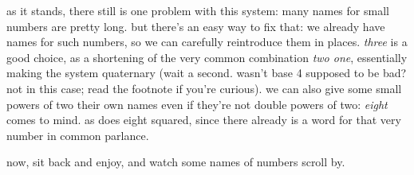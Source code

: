 \documentclass[../best.tex]{subfiles}
\begin{document}
as it stands, there still is one problem with this system: many names for small numbers are pretty long. but there's an easy way to fix that: we already have names for such numbers, so we can carefully reintroduce them in places. {\it three} is a good choice, as a shortening of the very common combination {\it two one}, essentially making the system quaternary (wait a second. wasn't base 4 supposed to be bad? not in this case; read the footnote if you're curious).\myfootnote{} we can also give some small powers of two their own names even if they're not double powers of two: {\it eight} comes to mind.\myfootnote{} as does eight squared,\myfootnote{} since there already is a word for that very number in common parlance.

now, sit back and enjoy, and watch some names of numbers scroll by.
\end{document}
